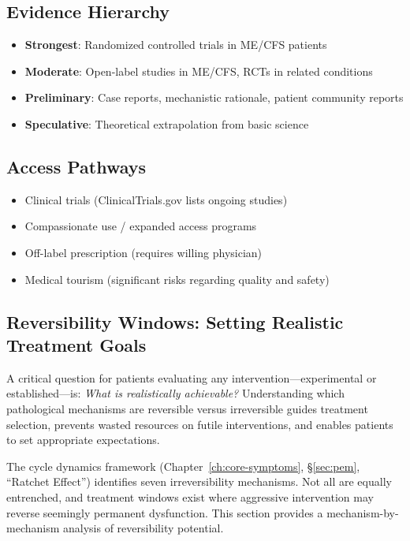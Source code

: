 \subsection{Evidence Hierarchy}

\begin{itemize}
    \item \textbf{Strongest}: Randomized controlled trials in ME/CFS patients
    \item \textbf{Moderate}: Open-label studies in ME/CFS, RCTs in related conditions
    \item \textbf{Preliminary}: Case reports, mechanistic rationale, patient community reports
    \item \textbf{Speculative}: Theoretical extrapolation from basic science
\end{itemize}

\subsection{Access Pathways}

\begin{itemize}
    \item Clinical trials (ClinicalTrials.gov lists ongoing studies)
    \item Compassionate use / expanded access programs
    \item Off-label prescription (requires willing physician)
    \item Medical tourism (significant risks regarding quality and safety)
\end{itemize}

\subsection{Reversibility Windows: Setting Realistic Treatment Goals}
\label{subsec:reversibility-windows}

A critical question for patients evaluating any intervention---experimental or established---is: \textit{What is realistically achievable?} Understanding which pathological mechanisms are reversible versus irreversible guides treatment selection, prevents wasted resources on futile interventions, and enables patients to set appropriate expectations.

The cycle dynamics framework (Chapter~\ref{ch:core-symptoms}, \S\ref{sec:pem}, ``Ratchet Effect'') identifies seven irreversibility mechanisms. Not all are equally entrenched, and treatment windows exist where aggressive intervention may reverse seemingly permanent dysfunction. This section provides a mechanism-by-mechanism analysis of reversibility potential.

